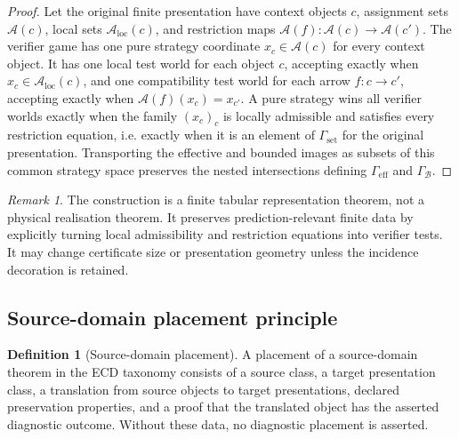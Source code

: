 \documentclass[11pt]{article}
\theoremstyle{plain}
\theoremstyle{definition}
\newtheorem{definition}[theorem]{Definition}
\theoremstyle{remark}
\newtheorem{remark}[theorem]{Remark}
\newcommand{\LocalAdm}{\mathcal{A}_{\mathrm{loc}}}
\begin{document}
\begin{proof}
Let the original finite presentation have context objects $c$, assignment sets
$\mathcal A(c)$, local sets $\LocalAdm(c)$, and restriction maps
$\mathcal A(f):\mathcal A(c)\to\mathcal A(c')$. The verifier game has one pure
strategy coordinate $x_c\in\mathcal A(c)$ for every context object. It has one
local test world for each object $c$, accepting exactly when
$x_c\in\LocalAdm(c)$, and one compatibility test world for each arrow
$f:c\to c'$, accepting exactly when $\mathcal A(f)(x_c)=x_{c'}$. A pure strategy
wins all verifier worlds exactly when the family $(x_c)_c$ is locally admissible
and satisfies every restriction equation, i.e. exactly when it is an element of
$\Gamma_{\mathrm{set}}$ for the original presentation. Transporting the effective
and bounded images as subsets of this common strategy space preserves the nested
intersections defining $\Gamma_{\mathrm{eff}}$ and $\Gamma_{\mathcal B}$.
\end{proof}

\begin{remark}
The construction is a finite tabular representation theorem, not a physical
realisation theorem. It preserves prediction-relevant finite data by explicitly
turning local admissibility and restriction equations into verifier tests. It may
change certificate size or presentation geometry unless the incidence decoration
is retained.
\end{remark}

\subsection{Source-domain placement principle}

\begin{definition}[Source-domain placement]
\label{def:source-domain-placement}
A placement of a source-domain theorem in the ECD taxonomy consists of a source
class, a target presentation class, a translation from source objects to target
presentations, declared preservation properties, and a proof that the translated
object has the asserted diagnostic outcome. Without these data, no diagnostic
placement is asserted.
\end{definition}
\end{document}
